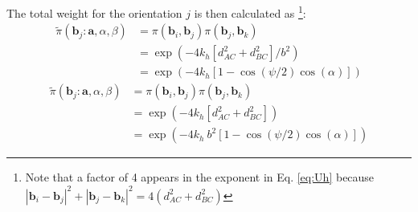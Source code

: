         The total weight for the orientation $j$ is then calculated as \footnote{Note that a factor of 4 appears in the exponent in Eq. \eqref{eq:Uh} because $|{\mathbf b}_i - {\mathbf b}_j|^2 + |{\mathbf b}_j - {\mathbf b}_k|^2 = 4 (d_{AC}^2 + d_{BC}^2)$}:
        \ifkhExplicitP
            \begin{equation}
            \label{eq:Uh}
                \begin{aligned}
                    \tilde \pi({\mathbf b}_j: \mathbf{a}, \alpha, \beta)  &= \pi({\mathbf b}_i,{\mathbf b}_j)\pi({\mathbf b}_j,{\mathbf b}_k)\\
                    &= \exp\left(-4 k_h [d_{AC}^2 + d_{BC}^2]/b^2\right)\\
                    &= \exp\left(-4 k_h [1 - \cos(\psi/2) \cos(\alpha)]\right)
                \end{aligned}
            \end{equation}
        \else
            \begin{equation}
            \label{eq:Uh}
                \begin{aligned}
                    \tilde \pi({\mathbf b}_j: \mathbf{a}, \alpha, \beta)  &= \pi({\mathbf b}_i,{\mathbf b}_j)\pi({\mathbf b}_j,{\mathbf b}_k)\\
                    &= \exp\left(-4 k_h [d_{AC}^2 + d_{BC}^2]\right)\\
                    &= \exp\left(-4k_h~b^2 [1 - \cos(\psi/2) \cos(\alpha)]\right)
                \end{aligned}
            \end{equation}
        \fi

